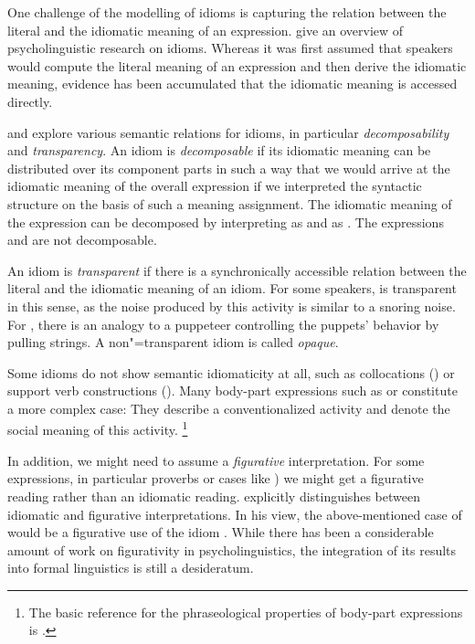 \documentclass[output=paper
                ,modfonts
                ,nonflat
	        ,collection
	        ,collectionchapter
	        ,collectiontoclongg
 	        ,biblatex
                ,babelshorthands
                ,newtxmath
                ,draftmode
                ,colorlinks, citecolor=brown
]{./langsci/langscibook}
\begin{document}
One challenge of the modelling of idioms is capturing the relation between the literal and the idiomatic meaning of an expression.
\citet{Gibbs:Colston:07} give an overview of 
psycholinguistic research on idioms. Whereas it was first assumed that speakers would compute the literal meaning of an expression and then derive the idiomatic meaning, evidence has been accumulated that the idiomatic meaning is accessed directly.

\citet{WSN84a-u} and \citet{NSW94a} explore various semantic relations for idioms, in particular \emph{decomposability}  and \emph{transparency}.
An idiom is \emph{decomposable} if its idiomatic meaning can be distributed over its component parts in such a way that we would arrive at the idiomatic meaning of the overall expression if we interpreted the syntactic structure on the basis of such a meaning assignment. 
The idiomatic meaning of the expression  can be decomposed by interpreting  as  and  as . 
The expressions  and  are not decomposable.

An idiom is \emph{transparent} if there is a synchronically accessible relation between the literal and the idiomatic meaning of an idiom. 
For some speakers,  is transparent in this sense, as the noise produced by this activity is similar to a snoring noise. 
For , there is an analogy to a puppeteer controlling the puppets' behavior by pulling strings. A non"=transparent idiom is called \emph{opaque}. 

Some idioms do not show semantic idiomaticity at all, such as collocations () or support verb constructions (). 
Many body-part expressions such as  or  constitute a more complex case: They describe a conventionalized activity and denote the social meaning of this activity.%
\footnote{The basic reference for the phraseological properties of body-part expressions is \cite{Burger:76}.}

In addition, we might need to assume a \emph{figurative} interpretation. For some expressions, in particular proverbs or cases like 
) we might get a figurative reading rather than an idiomatic reading. 
%
\citet{Glucksberg:01} explicitly distinguishes between idiomatic and figurative interpretations. In his view, the above-mentioned case of  would be a figurative use of the idiom . 
While there has been a considerable amount of work on figurativity in psycholinguistics, the integration of its results into formal linguistics is still a desideratum.%
\end{document}
